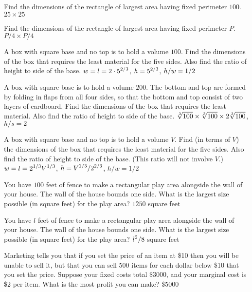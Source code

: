 \exercise
Find the dimensions of the rectangle of largest area having fixed perimeter
$100$.
\answer $25\times 25$
\endanswer
\endexercise

\exercise
Find the dimensions of the rectangle of largest area having fixed perimeter
$P$.
\answer $P/4\times P/4$
\endanswer
\endexercise

\exercise
A box with square base and no top is to hold a volume $100$.  Find
the dimensions of the box that requires the least material for the
five sides.  Also find the ratio of height to side of the base.
\answer $\displaystyle w=l=2\cdot 5^{2/3}$, $\displaystyle h=5^{2/3}$, $\displaystyle h/w=1/2$
\endanswer

\endexercise

\exercise A box with square base is to hold a volume
$200$. The bottom and top are formed by folding in flaps from all four
sides, so that the bottom and top consist of two layers of cardboard.
Find the dimensions of the box that requires the least material.
Also find the ratio of height to side of the base.
\answer $\ds \root 3\of {100}\times\root 3\of {100}\times 2\root 3\of
{100}$, $h/s=2$
\endanswer
\endexercise

\exercise
A box with square base and no top is to hold a volume $V$.  Find (in terms
of $V$) the dimensions of the box that requires the least material for the
five sides.  Also find the ratio of height to side of the base.  (This
ratio will not involve $V$.)
\answer $\displaystyle w=l=2^{1/3}V^{1/3}$, $\displaystyle h=V^{1/3}/2^{2/3}$, $h/w=1/2$
\endanswer
\endexercise

\exercise
You have $100$ feet of fence to make a rectangular play area alongside the
wall of your house.  The wall of the house bounds one side.  What is the
largest size possible (in square feet) for the play area?
\answer $1250$ square feet
\endanswer
\endexercise

\exercise
You have $l$ feet of fence to make a rectangular play area alongside the
wall of your house.  The wall of the house bounds one side.  What is the
largest size possible (in square feet) for the play area?
\answer $\displaystyle l^2/8$ square feet
\endanswer
\endexercise

\exercise
Marketing tells you that if you set the price of an item at \$10
then you will be unable to sell it, but that you can sell 500 items for
each dollar below \$10 that you set the price.  Suppose your fixed costs total
\$3000, and your marginal cost is \$2 per item.  What is the most profit
you can make?
\answer \$5000
\endanswer
\endexercise

